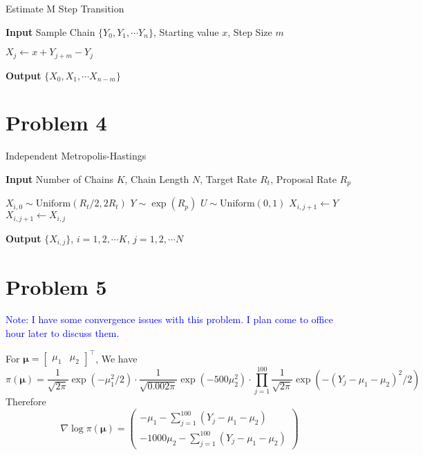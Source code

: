 \documentclass[12pt]{article}
\begin{document}
\begin{algorithm}
	\caption{Estimate M Step Transition}\label{mstepest}
	\hspace*{\algorithmicindent} \textbf{Input} Sample Chain $\{Y_0, Y_1, \cdots Y_n \}$, Starting value $x$, Step Size $m$
	\begin{algorithmic}[1]
		\State $X_j \gets x + Y_{j+m} - Y_{j}$
		\EndFor
	\end{algorithmic}
	\hspace*{\algorithmicindent} \textbf{Output} $\{X_0, X_1, \cdots X_{n-m} \}$
\end{algorithm}


\section*{Problem 4}

\begin{algorithm}
	\caption{Independent Metropolis-Hastings}\label{IMH}
	\hspace*{\algorithmicindent} \textbf{Input} Number of Chains $K$, Chain Length $N$, Target Rate $R_{t}$, Proposal Rate $R_{p}$
	\begin{algorithmic}[1]
			\State $X_{i,0} \sim \text{Uniform}(R_t/2, 2R_t)$
			\State $Y \sim \exp (R_p)$
			\State $U \sim \text{Uniform}(0, 1)$
			\State $X_{i,j+1}\gets Y$
			\Else
			\State $X_{i,j+1}\gets X_{i,j}$
			\EndIf
			\EndFor
		\EndFor
	\end{algorithmic}
	\hspace*{\algorithmicindent} \textbf{Output} $\{ X_{i,j}\}$, $i=1,2,\cdots K$, $j=1,2,\cdots N$
\end{algorithm}


\section*{Problem 5}

\textcolor{blue}{Note: I have some convergence issues with this problem. I plan come to office hour later to discuss them.}

 For $\bm{\mu} = \begin{bmatrix}\mu_1 & \mu_2\end{bmatrix}^\top$, We have 
 \[ \pi (\bm{\mu}) = \frac{1}{\sqrt{2\pi}} \exp\left( -\mu_1^2/2\right)\cdot \frac{1}{\sqrt{0.002\pi}}\exp\left( -500\mu_2^2\right)\cdot \prod_{j=1}^{100}\frac{1}{\sqrt{2\pi}} \exp \left(-(Y_j - \mu_1 - \mu_2)^2 / 2 \right)  \] 
Therefore
\[ \nabla \log \pi(\bm{\mu}) = \begin{pmatrix}
	-\mu_1 - \sum_{j=1}^{100}(Y_j - \mu_1 - \mu_2) \\
	-1000 \mu_2 - \sum_{j=1}^{100}(Y_j - \mu_1 - \mu_2)
 \end{pmatrix} \]
\end{document}
